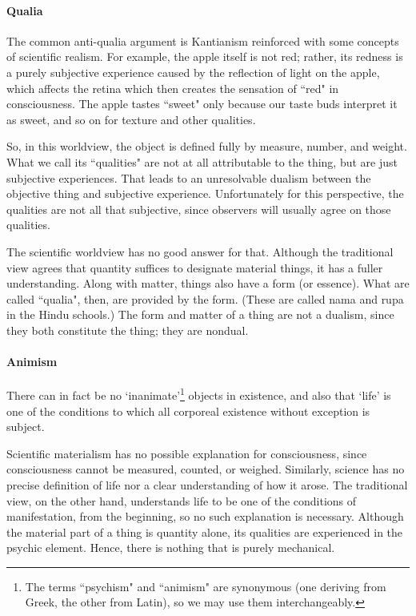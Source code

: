 \paragraph{Qualia}
The common anti-qualia argument is Kantianism reinforced with some concepts of scientific realism. For example, the apple itself is not red; rather, its redness is a purely subjective experience caused by the reflection of light on the apple, which affects the retina which then creates the sensation of ``red" in consciousness. The apple tastes ``sweet" only because our taste buds interpret it as sweet, and so on for texture and other qualities.

So, in this worldview, the object is defined fully by measure, number, and weight. What we call its ``qualities" are not at all attributable to the thing, but are just subjective experiences. That leads to an unresolvable dualism between the objective thing and subjective experience. Unfortunately for this perspective, the qualities are not all that subjective, since observers will usually agree on those qualities.

The scientific worldview has no good answer for that. Although the traditional view agrees that quantity suffices to designate material things, it has a fuller understanding. Along with matter, things also have a form (or essence). What are called ``qualia", then, are provided by the form. (These are called nama and rupa in the Hindu schools.) The form and matter of a thing are not a dualism, since they both constitute the thing; they are nondual.

\paragraph{Animism}
\begin{quotex}
There can in fact be no `inanimate'\footnote{The terms ``psychism" and ``animism" are synonymous (one deriving from Greek, the other from Latin), so we may use them interchangeably.} objects in existence, and also that `life' is one of the conditions to which all corporeal existence without exception is subject. 

\end{quotex}

Scientific materialism has no possible explanation for consciousness, since consciousness cannot be measured, counted, or weighed. Similarly, science has no precise definition of life nor a clear understanding of how it arose. The traditional view, on the other hand, understands life to be one of the conditions of manifestation, from the beginning, so no such explanation is necessary. Although the material part of a thing is quantity alone, its qualities are experienced in the psychic element. Hence, there is nothing that is purely mechanical.

